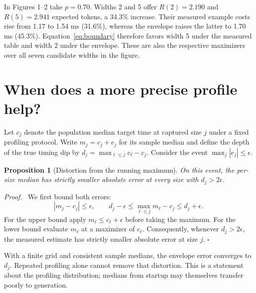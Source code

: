 \documentclass[11pt]{article}
\newtheorem{proposition}{Proposition}
\newenvironment{proof}{\par\noindent\textit{Proof.}\ }{\unskip\nobreak\hfill$\square$\par}
\begin{document}
In Figures 1--2 take $p=0.70$. Widths 2 and 5 offer $R(2)=2.190$ and $R(5)=2.941$ expected tokens, a 34.3\% increase. Their measured example costs rise from 1.17 to 1.54 ms (31.6\%), whereas the envelope raises the latter to 1.70 ms (45.3\%). Equation~\eqref{eq:boundary} therefore favors width 5 under the measured table and width 2 under the envelope. These are also the respective maximizers over all seven candidate widths in the figure.

\clearpage
\section{When does a more precise profile help?}
Let $c_j$ denote the population median target time at captured size $j$ under a fixed profiling protocol. Write $m_j=c_j+e_j$ for its sample median and define the depth of the true timing dip by $d_j=\max_{\ell\le j}c_\ell-c_j$. Consider the event $\max_j|e_j|\le\epsilon$. \begin{proposition}[Distortion from the running maximum] On this event, the per-size median has strictly smaller absolute error at every size with $d_j>2\epsilon$.\end{proposition}
\begin{proof} We first bound both errors:
\begin{equation}
 |m_j-c_j|\le\epsilon,\qquad
 d_j-\epsilon\le \max_{\ell\le j}m_\ell-c_j\le d_j+\epsilon .
\end{equation}
For the upper bound apply $m_\ell\le c_\ell+\epsilon$ before taking the maximum. For the lower bound evaluate $m_\ell$ at a maximizer of $c_\ell$. Consequently, whenever $d_j>2\epsilon$, the measured estimate has strictly smaller absolute error at size $j$. \end{proof} With a finite grid and consistent sample medians, the envelope error converges to $d_j$. Repeated profiling alone cannot remove that distortion. This is a statement about the profiling distribution; medians from startup may themselves transfer poorly to generation.
\end{document}

